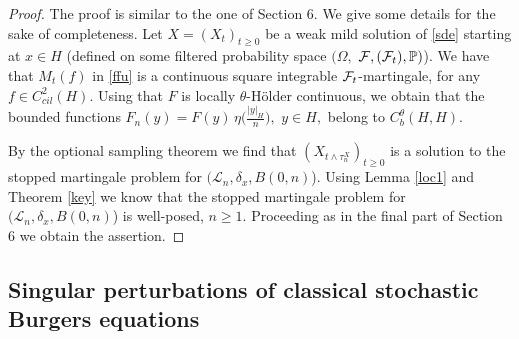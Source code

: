 \documentclass[preprint]{imsart}
\def\P{\mathbb P}
\def\L{\mathcal L}
\begin{document}
  \begin{proof}  The proof is similar to the one of Section 6.
   We give
    some details  
   for the sake of completeness.  
   Let $X= (X_t)_{t \ge 0}$  be a weak mild solution of \eqref{sde} starting at $x \in H$ (defined on some filtered probability space $(
\Omega,$ $ {\cal F},
 ({\cal F}_{t}), \P) $).
 We   have that $M_t(f)$ in \eqref{ffu} is   a continuous square integrable ${\cal F}_t$-martingale, for any 
   $f \in C^2_{cil}(H)$.
    Using   that  $F$ is locally $\theta$-H\"older continuous, we obtain that  the bounded  functions $
F_n(y) = F(y)\,  \eta \big(\frac{ |y|_H}{n}\big), $ $ y \in H,
$ belong to $C_b^{\theta}(H,H)$. 
 
 By the optional sampling theorem 
  we find that  $(X_{ t\wedge \tau_n^X  })_{t \ge 0} $ is a solution to  the  { stopped martingale problem for $(\L_n, \delta_x, B(0,n)$).}
  Using Lemma \ref{loc1} and Theorem  \ref{key}     we know that  the   stopped martingale problem for   $(\L_n, \delta_x, B(0,n)$) is well-posed, $n \ge 1$.  Proceeding as in the final part  of Section 6 we obtain the assertion.
\end{proof}
  
  
  
\subsection{Singular perturbations of classical stochastic Burgers equations}   
\end{document}
